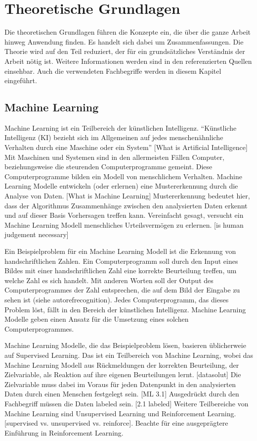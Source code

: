 \chapter{Theoretische Grundlagen}
\label{chap:t}
Die theoretischen Grundlagen führen die Konzepte ein, die über die ganze Arbeit
hinweg Anwendung finden. Es handelt sich dabei um Zusammenfassungen. Die Theorie
wird auf den Teil reduziert, der für ein grundsätzliches Verständnis der Arbeit
nötig ist. Weitere Informationen werden sind in den referenzierten Quellen
einsehbar. Auch die verwendeten Fachbegriffe werden in diesem Kapitel
eingeführt. 

\section{Machine Learning}
\label{chap:t_ml}
Machine Learning ist ein Teilbereich der künstlichen Intelligenz. ``Künstliche
Intelligenz (KI) bezieht sich im Allgemeinen auf jedes menschenähnliche
Verhalten durch eine Maschine oder ein System'' [What is Artificial Intelligence] Mit Maschinen und                
Systemen sind in den allermeisten Fällen Computer, beziehungsweise die
steurenden Computerprogramme gemeint. Diese Computerprogramme bilden ein Modell
von menschlichem Verhalten. Machine Learning Modelle entwickeln (oder erlernen)
eine Mustererkennung durch die Analyse von Daten. [What is Machine Learning]
Mustererkennung bedeutet hier, dass der Algorithmus Zusammenhänge zwischen den
analysierten Daten erkennt und auf dieser Basis Vorhersagen treffen kann.
Vereinfacht gesagt, versucht ein Machine Learning Modell menschliches
Urteilsvermögen zu erlernen. [is human judgement necessary]

Ein Beispielproblem für ein Machine Learning Modell ist die Erkennung von
handschriftlichen Zahlen. Ein Computerprogramm soll durch den Input eines Bildes
mit einer handschriftlichen Zahl eine korrekte Beurteilung treffen, um welche
Zahl es sich handelt. Mit anderen Worten soll der Output des Computerprogrammes
der Zahl entsprechen, die auf dem Bild der Eingabe zu sehen ist (siehe autoref{recognition}). Jedes
Computerprogramm, das dieses Problem löst, fällt in den Bereich der künstlichen
Intelligenz. Machine Learning Modelle geben einen Ansatz für die Umsetzung eines
solchen Computerprogrammes.


Machine Learning Modelle, die das Beispielproblem lösen, basieren üblicherweie
auf Supervised Learning. Das ist ein Teilbereich von Machine Learning, wobei das
Machine Learning Modell aus Rückmeldungen der korrekten Beurteilung, der
Zielvariable, als Reaktion auf ihre eigenen Beurteilungen lernt. [datasolut] Die
Zielvariable muss dabei im Voraus für jeden Datenpunkt in den analysierten Daten
durch einen Menschen festgelegt sein. [ML 3.1] Ausgedrückt durch den Fachbegriff müssen die
Daten labeled sein. [2.1 labeled] Weitere Teilbereiche von Machine Learning sind
Unsupervised Learning und Reinforcement Learning. [supervised vs. unsupervised
vs. reinforce]. Beachte  für eine ausgeprägtere Einführung
in Reinforcement Learning.

